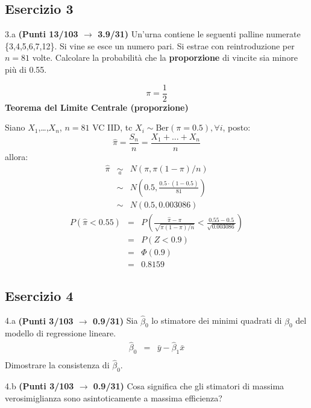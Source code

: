 \documentclass[
  11pt,
]{book}
\theoremstyle{mytheoremstyle}
\theoremstyle{mydefstyle}
\newenvironment{sol}
  {
  \begin{tcolorbox}[enhanced,breakable,arc=0.1mm,boxrule=1pt,colback=white,colframe=iblue,
  title=\bf \fontfamily{lmss}\selectfont \hspace{.5 cm} Soluzione,drop fuzzy shadow]

}{
\end{tcolorbox}
  }
\begin{document}
\subsection{Esercizio 3}\label{esercizio-3-32}

3.a \textbf{(Punti 13/103 \(\rightarrow\) 3.9/31)} Un'urna contiene le seguenti palline numerate \{3,4,5,6,7,12\}. Si vine se esce un numero pari. Si estrae con reintroduzione per \(n=81\) volte.
Calcolare la probabilità che la \textbf{proporzione} di vincite sia minore più di 0.55.

\begin{sol}
\[\pi=\frac 12\]
\textbf{Teorema del Limite Centrale (proporzione)}

Siano \(X_1\),\ldots,\(X_n\), \(n=81\) VC IID, tc \(X_i\sim\text{Ber}(\pi=0.5)\)\(,\forall i\), posto:
\[
      \hat\pi=\frac{S_n}n = \frac{X_1 + ... + X_n}n
      \]
allora:\begin{eqnarray*}
  \hat\pi & \mathop{\sim}\limits_{a}& N(\pi,\pi(1-\pi)/n) \\
  &\sim & N\left(0.5,\frac{0.5\cdot(1-0.5)}{81}\right) \\
     &\sim & N(0.5,0.003086) 
  \end{eqnarray*}\begin{eqnarray*}
      P( \hat\pi   <   0.55 ) 
        &=& P\left(  \frac { \hat\pi  -  \pi }{ \sqrt{\pi(1-\pi)/n} }  <  \frac { 0.55  -  0.5 }{\sqrt{ 0.003086 }} \right)  \\
                 &=& P\left(  Z   <   0.9 \right) \\    
                 &=&  \Phi( 0.9 ) \\ &=&  0.8159 
      \end{eqnarray*}

\end{sol}

\subsection{Esercizio 4}\label{esercizio-4-32}

4.a \textbf{(Punti 3/103 \(\rightarrow\) 0.9/31)} Sia \(\hat \beta_0\) lo stimatore dei minimi quadrati di \(\beta_0\) del modello di regressione lineare.
\begin{eqnarray*}
  \hat\beta_0 &=&\bar y-  \hat\beta_1\bar x\\
\end{eqnarray*}
Dimostrare la consistenza di \(\hat\beta_0\).

4.b \textbf{(Punti 3/103 \(\rightarrow\) 0.9/31)} Cosa significa che gli stimatori di massima verosimiglianza sono asintoticamente a massima efficienza?
\end{document}
